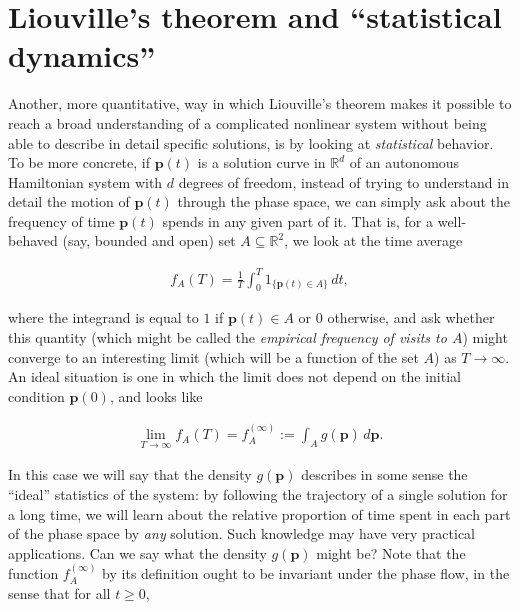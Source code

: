 \documentclass[11pt]{report}
\theoremstyle{plain}
\theoremstyle{definition}
\begin{document}
\section{Liouville's theorem and ``statistical dynamics''}

Another, more quantitative, way in which Liouville's
theorem makes it possible to reach a broad
understanding of a complicated nonlinear system
without being able to describe in detail specific
solutions, is by looking at \emph{statistical} behavior. To
be more concrete, if $\mathbf{p}(t)$ is a solution
curve in $\mathbb{R}^d$ of an autonomous Hamiltonian
system with $d$ degrees of freedom, instead of trying
to understand in detail the motion of $\mathbf{p}(t)$
through the phase space, we can simply ask about the
frequency of time $\mathbf{p}(t)$ spends in any given
part of it. That is, for a well-behaved (say, bounded
and open) set $A \subseteq \mathbb{R}^2$, we look at
the time average

\begin{align*}
f_A(T) = \frac{1}{T} \int_0^T 1_{\{ \mathbf{p}(t) \in A\}}\,dt,
\end{align*}

\noindent where the integrand is equal to $1$ if
$\mathbf{p}(t)\in A$ or $0$ otherwise, and ask whether
this quantity (which might be called the \emph{empirical
frequency of visits to $A$}) might converge to an
interesting limit (which will be a function of the set
$A$) as $T\to\infty$. An ideal situation is one in
which the limit does not depend on the initial
condition $\mathbf{p}(0)$, and looks like

\begin{equation*} \tag{20}\label{eq:idealdensity}
\begin{split}
\lim_{T\to\infty} f_A(T) = f_A^{(\infty)} := \int_A g(\mathbf{p})\,d\mathbf{p}.
\end{split}
\end{equation*}

\noindent In this case we will say that the density
$g(\mathbf{p})$ describes in some sense the ``ideal''
statistics of the system: by following the trajectory
of a single solution for a long time, we will learn
about the relative proportion of time spent in each
part of the phase space by \emph{any} solution. Such
knowledge may have very practical applications. Can we
say what the density $g(\mathbf{p})$ might be? Note
that the function $f_A^{(\infty)}$ by its definition
ought to be invariant under the phase flow, in the
sense that for all $t\ge 0$,
\end{document}
